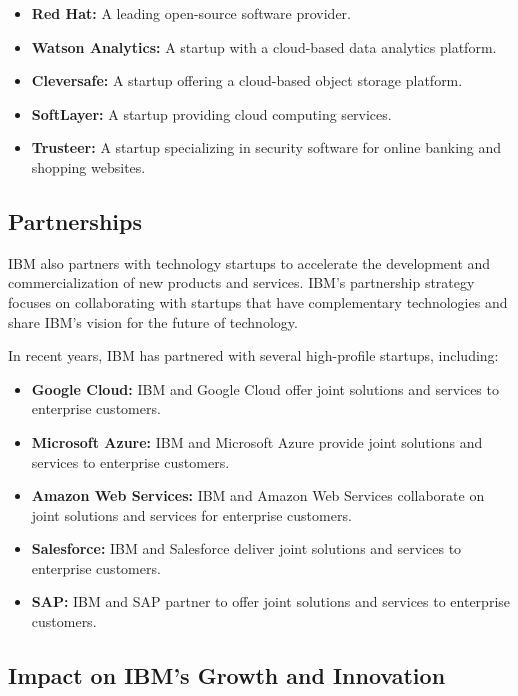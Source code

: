 \begin{itemize}
    \item \textbf{Red Hat:} A leading open-source software provider.
    \item \textbf{Watson Analytics:} A startup with a cloud-based data analytics platform.
    \item \textbf{Cleversafe:} A startup offering a cloud-based object storage platform.
    \item \textbf{SoftLayer:} A startup providing cloud computing services.
    \item \textbf{Trusteer:} A startup specializing in security software for online banking and shopping websites.
\end{itemize}

\subsection{Partnerships}

IBM also partners with technology startups to accelerate the development and commercialization of new products and services. IBM's partnership strategy focuses on collaborating with startups that have complementary technologies and share IBM's vision for the future of technology.

In recent years, IBM has partnered with several high-profile startups, including:

\begin{itemize}
    \item \textbf{Google Cloud:} IBM and Google Cloud offer joint solutions and services to enterprise customers.
    \item \textbf{Microsoft Azure:} IBM and Microsoft Azure provide joint solutions and services to enterprise customers.
    \item \textbf{Amazon Web Services:} IBM and Amazon Web Services collaborate on joint solutions and services for enterprise customers.
    \item \textbf{Salesforce:} IBM and Salesforce deliver joint solutions and services to enterprise customers.
    \item \textbf{SAP:} IBM and SAP partner to offer joint solutions and services to enterprise customers.
\end{itemize}

\subsection{Impact on IBM's Growth and Innovation}

